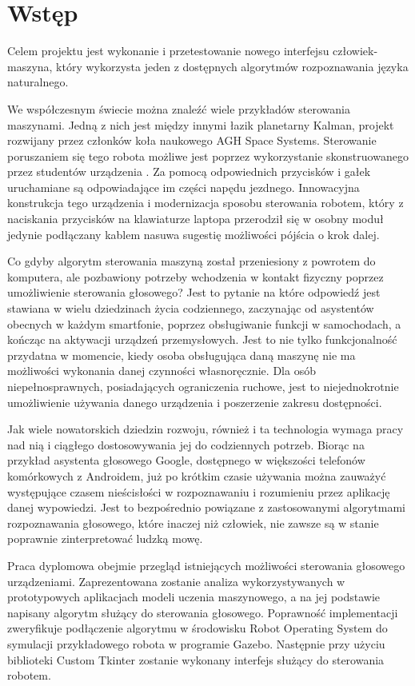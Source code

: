 \chapter{Wstęp}
\label{cha:Wstęp}

Celem projektu jest wykonanie i przetestowanie nowego interfejsu człowiek-maszyna, który wykorzysta jeden z dostępnych algorytmów rozpoznawania języka naturalnego.

We współczesnym świecie można znaleźć wiele przykładów sterowania maszynami. Jedną z nich jest między innymi łazik planetarny Kalman, projekt rozwijany przez członków koła naukowego AGH Space Systems.  Sterowanie poruszaniem się tego robota możliwe jest poprzez wykorzystanie skonstruowanego przez studentów urządzenia \cite{jklazik}. Za pomocą odpowiednich przycisków i gałek uruchamiane są odpowiadające im części napędu jezdnego. Innowacyjna konstrukcja tego urządzenia i modernizacja sposobu sterowania robotem, który z naciskania przycisków na klawiaturze laptopa przerodził się w osobny moduł jedynie podłączany kablem nasuwa sugestię możliwości pójścia o krok dalej.

Co gdyby algorytm sterowania maszyną został przeniesiony z powrotem do komputera, ale pozbawiony potrzeby wchodzenia w kontakt fizyczny poprzez umożliwienie sterowania głosowego? Jest to pytanie na które odpowiedź jest stawiana w wielu dziedzinach życia codziennego, zaczynając od asystentów obecnych w każdym smartfonie, poprzez obsługiwanie funkcji w samochodach, a kończąc na aktywacji urządzeń przemysłowych. Jest to nie tylko funkcjonalność przydatna w momencie, kiedy osoba obsługująca daną maszynę nie ma możliwości wykonania danej czynności własnoręcznie. Dla osób niepełnosprawnych, posiadających ograniczenia ruchowe, jest to niejednokrotnie umożliwienie używania danego urządzenia i poszerzenie zakresu dostępności.

Jak wiele nowatorskich dziedzin rozwoju, również i ta technologia wymaga pracy nad nią i ciągłego dostosowywania jej do codziennych potrzeb. Biorąc na przykład asystenta głosowego Google, dostępnego w większości telefonów komórkowych z Androidem, już po krótkim czasie używania można zauważyć występujące czasem nieścisłości w rozpoznawaniu i rozumieniu przez aplikację danej wypowiedzi. Jest to bezpośrednio powiązane z zastosowanymi algorytmami rozpoznawania głosowego, które inaczej niż człowiek, nie zawsze są w stanie poprawnie zinterpretować ludzką mowę. 

Praca dyplomowa obejmie przegląd istniejących możliwości sterowania głosowego urządzeniami. Zaprezentowana zostanie analiza wykorzystywanych w prototypowych aplikacjach modeli uczenia maszynowego, a na jej podstawie napisany algorytm służący do sterowania głosowego. Poprawność implementacji zweryfikuje podłączenie algorytmu w środowisku Robot Operating System do symulacji przykładowego robota w programie Gazebo. Następnie przy użyciu biblioteki Custom Tkinter zostanie wykonany interfejs służący do sterowania robotem.


